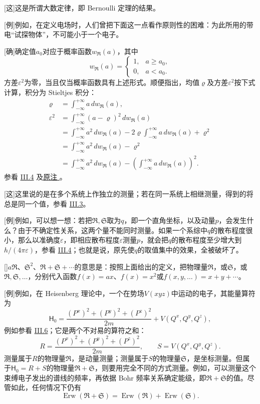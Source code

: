 \documentclass[fontsize=13pt,twoside,openany,headings=normal,parskip=false,bookmarkpackage=false,DIV=calc]{scrbook}
\begin{document}
[这]{这是所谓大数定律，即 Bernoulli 定理的结果。}

[例]{\hypertarget{origpage-256}{}\label{origpage-256}例如，在定义电场时，人们曾把下面这一点看作原则性的困难：为此所用的带电“试探物体”，不可能小于一个电子。}

[确]{确定值$a_0$对应于概率函数$w_{\mathfrak R}(a)$，其中
\[
w_{\mathfrak R}(a)=\begin{cases}1,&a\ge a_0,\\0,&a<a_0.\end{cases}
\]
方差$\varepsilon^2$为零，当且仅当概率函数具有上述形式。顺便指出，均值$\varrho$及方差$\varepsilon^2$按下式计算，积分为 Stieltjes 积分：
\begin{align*}
\varrho&=\int_{-\infty}^{+\infty}a\,dw_{\mathfrak R}(a),\\
\varepsilon^2&=\int_{-\infty}^{+\infty}(a-\varrho)^2\,dw_{\mathfrak R}(a)\\
&=\int_{-\infty}^{+\infty}a^2\,dw_{\mathfrak R}(a)-2\varrho\int_{-\infty}^{+\infty}a\,dw_{\mathfrak R}(a)+\varrho^2\\
&=\int_{-\infty}^{+\infty}a^2\,dw_{\mathfrak R}(a)-\varrho^2\\
&=\int_{-\infty}^{+\infty}a^2\,dw_{\mathfrak R}(a)-\left(\int_{-\infty}^{+\infty}a\,dw_{\mathfrak R}(a)\right)^2.
\end{align*}
参看 \hyperref[sec:III.4]{III.4} 及\CJKglue \hyperlink{note-130}{原注 }。}

[这]{这里说的是在多个系统上作独立的测量；若在同一系统上相继测量，得到的将总是同一个值，参看 \hyperref[sec:III.3]{III.3}。}

[例]{例如，可以想一想：若把$\mathfrak R,\allowbreak \mathfrak S$取为$q$，即一个直角坐标，以及动量$p$，会发生什么？由于不确定性关系，这两个量不能同时测量。如果一个系综中$q$的散布程度很小，那么以准确度$\varepsilon$，即相应散布程度$\varepsilon$测量$p$，就会把$q$的散布程度至少增大到$h/(4\pi\varepsilon)$，参看 \hyperref[sec:III.4]{III.4}；也就是说，原先使$q$的取值集中的效果，全被破坏了。}

[]{$a\mathfrak R$、$\mathfrak S^2$、$\mathfrak R+\mathfrak S+\cdots$的意思是：按照上面给出的定义，把物理量$\mathfrak R$，或$\mathfrak S$，或$\mathfrak R,\allowbreak \mathfrak S,\allowbreak \ldots$，分别代入函数$f(x)=ax$、$f(x)=x^2$或$f(x,\allowbreak y,\allowbreak \ldots)=x+y+\cdots$。}

[例]{例如，在 Heisenberg 理论中，一个在势场$V(xyz)$中运动的电子，其能量算符为
\[
\mathsf H_0=\frac{(P^x)^2+(P^y)^2+(P^z)^2}{2m}+V(Q^x,Q^y,Q^z),
\]
例如参看 \hyperref[sec:III.6]{III.6}；它是两个不对易的算符之和：
\[
R=\frac{(P^x)^2+(P^y)^2+(P^z)^2}{2m},\qquad S=V(Q^x,Q^y,Q^z).
\]
测量属于$R$的物理量$\mathfrak R$，是动量测量；测量属于$S$的物理量$\mathfrak S$，是坐标测量。但属于$\mathsf H_0=R+S$的物理量$\mathfrak R+\mathfrak S$，则要用完全不同的方式测量。例如，可以测量这个束缚电子发出的谱线的频率，再依据 Bohr 频率关系确定能级，即$\mathfrak R+\mathfrak S$的值。尽管如此，任何情况下仍有
\[
\operatorname{Erw}(\mathfrak R+\mathfrak S)=\operatorname{Erw}(\mathfrak R)+\operatorname{Erw}(\mathfrak S).
\]}
\end{document}
